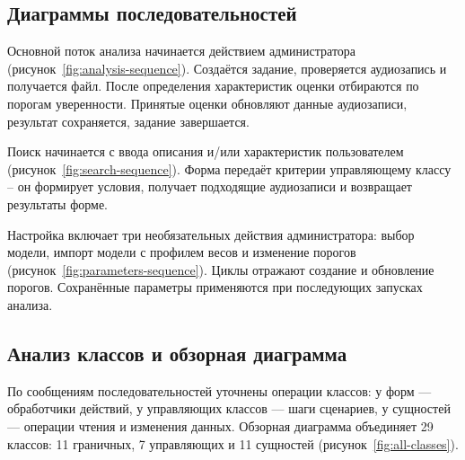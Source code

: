\begin{reportSheet}
\subsection{Диаграммы последовательностей}

Основной поток анализа начинается действием администратора
(рисунок~\ref{fig:analysis-sequence}). Создаётся задание, проверяется
аудиозапись и получается файл. После определения характеристик оценки
отбираются по порогам уверенности. Принятые оценки обновляют данные
аудиозаписи, результат сохраняется, задание завершается.

Поиск начинается с ввода описания и/или характеристик пользователем
(рисунок~\ref{fig:search-sequence}). Форма передаёт критерии
управляющему классу -- он формирует условия, получает подходящие аудиозаписи
и возвращает результаты форме.

Настройка включает три необязательных действия администратора:
выбор модели, импорт модели с профилем весов и изменение порогов
(рисунок~\ref{fig:parameters-sequence}). Циклы отражают создание
и обновление порогов. Сохранённые параметры применяются при последующих
запусках анализа.

\end{reportSheet}

\begin{reportSheet}
\subsection{Анализ классов и обзорная диаграмма}

По сообщениям последовательностей уточнены операции классов:
у форм --- обработчики действий, у управляющих классов --- шаги сценариев,
у сущностей --- операции чтения и изменения данных.
Обзорная диаграмма объединяет 29 классов: 11 граничных, 7 управляющих
и 11 сущностей (рисунок~\ref{fig:all-classes}).

\end{reportSheet}


